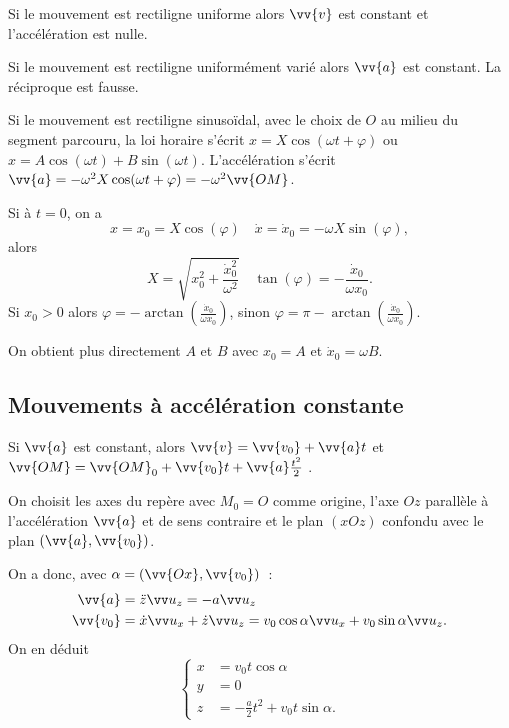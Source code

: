 Si le mouvement est rectiligne uniforme alors $\vv{v}$ est constant et l'accélération est nulle.

Si le mouvement est rectiligne uniformément varié alors $\vv{a}$ est constant. La réciproque est fausse.

Si le mouvement est rectiligne sinusoïdal, avec le choix de $O$ au milieu du segment parcouru, la loi horaire s'écrit $x=X\cos(\omega t+\varphi)$ ou $x=A\cos(\omega t) + B\sin(\omega t)$. L'accélération s'écrit $\vv{a}=-\omega^2X\cos(\omega t+\varphi)=-\omega^2 \vv{OM}$.

Si à $t=0$, on a
\begin{equation}
  x=x_0=X\cos(\varphi) \quad \dot{x}=\dot{x}_0=-\omega X\sin(\varphi),
\end{equation}
alors
\begin{equation}
  X=\sqrt{x_0^2+\frac{\dot{x}_0^2}{\omega^2}} \quad \tan(\varphi)=-\frac{\dot{x}_0}{\omega x_0}.
\end{equation}
Si $x_0>0$ alors $\varphi=-\arctan\left(\frac{\dot{x}_0}{\omega x_0}\right)$, sinon $\varphi=\pi-\arctan\left(\frac{\dot{x}_0}{\omega x_0}\right)$.

On obtient plus directement $A$ et $B$ avec $x_0=A$ et $\dot{x}_0=\omega B$.

\subsection{Mouvements à accélération constante}
\label{chap1-subsec:accelerationcst}

Si $\vv{a}$ est constant, alors $\vv{v}=\vv{v_0}+\vv{a}t$ et $\vv{OM}= \vv{OM}_0+ \vv{v_0} t + \vv{a}\frac{t^2}{2}$ .

On choisit les axes du repère avec $M_0=O$ comme origine, l'axe $Oz$ parallèle à l'accélération $\vv{a}$ et de sens contraire et le plan $(xOz)$ confondu avec le plan $(\vv{a},\vv{v_0})$.

On a donc, avec $\alpha=(\vv{Ox},\vv{v_0})$~:
\begin{align}
  \vv{a}&=\ddot{z} \uz=-a\uz \\
  \vv{v_0}&=\dot{x}\ux+\dot{z}\uz=v_0\cos\alpha\ux+v_0\sin\alpha\uz.
\end{align}
On en déduit
\begin{equation}
  \begin{cases}
    x&=v_0 t \cos\alpha\\
    y&=0\\
    z&=-\frac{a}{2}t^2+v_0 t \sin\alpha.
  \end{cases}
\end{equation}

